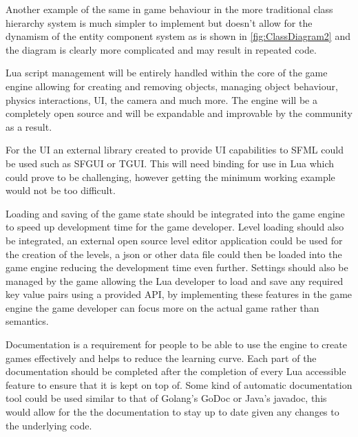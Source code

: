 \documentclass[11pt,a4paper,titlepage]{article}
\begin{document}
	Another example of the same in game behaviour in the more traditional class hierarchy system is much simpler to implement but doesn't allow for the dynamism of the entity component system as is shown in \ref{fig:ClassDiagram2} and the diagram is clearly more complicated and may result in repeated code. 

	Lua script management will be entirely handled within the core of the game engine allowing for creating and removing objects, managing object behaviour, physics interactions, UI, the camera and much more. The engine will be a completely open source and will be expandable and improvable by the community as a result.

	For the UI an external library created to provide UI capabilities to SFML could be used such as SFGUI or TGUI. This will need binding for use in Lua which could prove to be challenging, however getting the minimum working example would not be too difficult.

	Loading and saving of the game state should be integrated into the game engine to speed up development time for the game developer. Level loading should also be integrated, an external open source level editor application could be used for the creation of the levels, a json or other data file could then be loaded into the game engine reducing the development time even further. Settings should also be managed by the game allowing the Lua developer to load and save any required key value pairs using a provided API, by implementing these features in the game engine the game developer can focus more on the actual game rather than semantics.

	Documentation is a requirement for people to be able to use the engine to create games effectively and helps to reduce the learning curve. Each part of the documentation should be completed after the completion of every Lua accessible feature to ensure that it is kept on top of. Some kind of automatic documentation tool could be used similar to that of Golang's GoDoc or Java's javadoc, this would allow for the the documentation to stay up to date given any changes to the underlying code.
		
\end{document}
